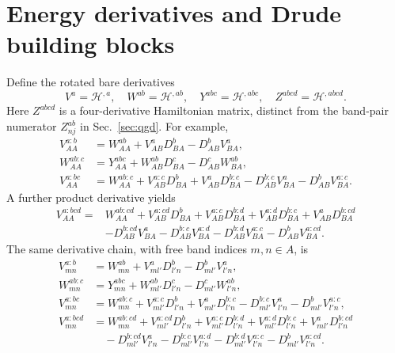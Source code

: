 \documentclass[prx,amsmath,amssymb,superscriptaddress,longbibliography]{revtex4-2}
\begin{document}
\section{Energy derivatives and Drude building blocks}
\label{sec:energy}
Define the rotated bare derivatives
\begin{equation}
 V^a=\mathcal H^{,a},\quad W^{ab}=\mathcal H^{,ab},\quad
 Y^{abc}=\mathcal H^{,abc},\quad Z^{abcd}=\mathcal H^{,abcd}.
 \label{eq:energy-ingredients}
\end{equation}
Here $Z^{abcd}$ is a four-derivative Hamiltonian matrix, distinct from the
band-pair numerator $Z_{nj}^{ab}$ in Sec.~\ref{sec:qgd}.
For example,
\begin{align}
 V_{AA}^{a:b}&=W_{AA}^{ab}+V_{AB}^aD_{BA}^b-D_{AB}^bV_{BA}^a,
 \label{eq:invmass}\\
 W_{AA}^{ab:c}&=Y_{AA}^{abc}+W_{AB}^{ab}D_{BA}^c-D_{AB}^cW_{BA}^{ab},
 \label{eq:derW}\\
 V_{AA}^{a:bc}&=W_{AA}^{ab:c}
 +V_{AB}^{a:c}D_{BA}^b+V_{AB}^aD_{BA}^{b:c}
 -D_{AB}^{b:c}V_{BA}^a-D_{AB}^bV_{BA}^{a:c}.
 \label{eq:third-energy}
\end{align}
A further product derivative yields
\begin{align}
 V_{AA}^{a:bcd}={}&W_{AA}^{ab:cd}
 +V_{AB}^{a:cd}D_{BA}^b+V_{AB}^{a:c}D_{BA}^{b:d}
 +V_{AB}^{a:d}D_{BA}^{b:c}+V_{AB}^aD_{BA}^{b:cd}
 \nonumber\\
 &-D_{AB}^{b:cd}V_{BA}^a-D_{AB}^{b:c}V_{BA}^{a:d}
 -D_{AB}^{b:d}V_{BA}^{a:c}-D_{AB}^bV_{BA}^{a:cd}.
 \label{eq:fourth-energy}
\end{align}
The same derivative chain, with free band indices $m,n\in A$, is
\begin{align}
 V_{mn}^{a:b}&=W_{mn}^{ab}+V_{ml'}^aD_{l'n}^b-D_{ml'}^bV_{l'n}^a,\nonumber\\
 W_{mn}^{ab:c}&=Y_{mn}^{abc}+W_{ml'}^{ab}D_{l'n}^c-D_{ml'}^cW_{l'n}^{ab},\nonumber\\
 V_{mn}^{a:bc}&=W_{mn}^{ab:c}
 +V_{ml'}^{a:c}D_{l'n}^b+V_{ml'}^aD_{l'n}^{b:c}
 -D_{ml'}^{b:c}V_{l'n}^a-D_{ml'}^bV_{l'n}^{a:c},\nonumber\\
 V_{mn}^{a:bcd}&=W_{mn}^{ab:cd}
 +V_{ml'}^{a:cd}D_{l'n}^b+V_{ml'}^{a:c}D_{l'n}^{b:d}
 +V_{ml'}^{a:d}D_{l'n}^{b:c}+V_{ml'}^aD_{l'n}^{b:cd}\nonumber\\
 &\quad-D_{ml'}^{b:cd}V_{l'n}^a-D_{ml'}^{b:c}V_{l'n}^{a:d}
 -D_{ml'}^{b:d}V_{l'n}^{a:c}-D_{ml'}^bV_{l'n}^{a:cd}.
 \label{eq:energy-derivative-components}
\end{align}
\end{document}
